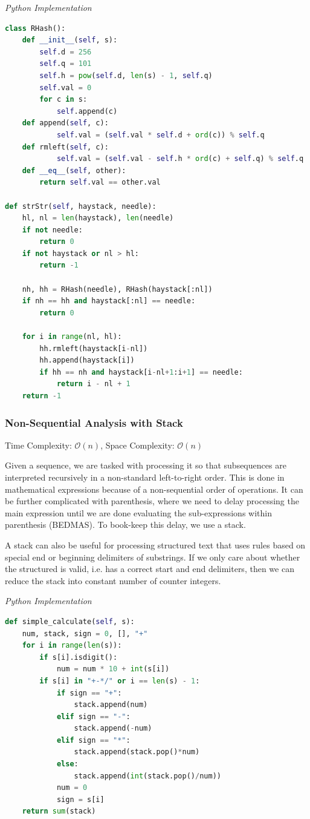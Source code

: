 \documentclass{article}
\newcommand{\bigO}{\mathcal{O}}
\begin{document}
\vspace{8pt} \emph{Python Implementation}
\begin{lstlisting}[language=Python]    
class RHash():
    def __init__(self, s):
        self.d = 256
        self.q = 101
        self.h = pow(self.d, len(s) - 1, self.q)
        self.val = 0
        for c in s:
            self.append(c)
    def append(self, c):
            self.val = (self.val * self.d + ord(c)) % self.q
    def rmleft(self, c):
            self.val = (self.val - self.h * ord(c) + self.q) % self.q 
    def __eq__(self, other):            
        return self.val == other.val
        
def strStr(self, haystack, needle):
    hl, nl = len(haystack), len(needle)
    if not needle:
        return 0
    if not haystack or nl > hl:
        return -1
  
    nh, hh = RHash(needle), RHash(haystack[:nl])
    if nh == hh and haystack[:nl] == needle:
        return 0
    
    for i in range(nl, hl):
        hh.rmleft(haystack[i-nl])
        hh.append(haystack[i])
        if hh == nh and haystack[i-nl+1:i+1] == needle:
            return i - nl + 1
    return -1
\end{lstlisting}

\subsubsection{Non-Sequential Analysis with Stack}
Time Complexity: $\bigO(n)$, Space Complexity: $\bigO(n)$

Given a sequence, we are tasked with processing it so that subsequences are interpreted recursively in a non-standard left-to-right order. This is done in mathematical expressions because of a non-sequential order of operations. It can be further complicated with parenthesis, where we need to delay processing the main expression until we are done evaluating the sub-expressions within parenthesis (BEDMAS). To book-keep this delay, we use a stack.

A stack can also be useful for processing structured text that uses rules based on special end or beginning delimiters of substrings. If we only care about whether the structured is valid, i.e. has a correct start and end delimiters, then we can reduce the stack into constant number of counter integers.

\vspace{8pt} \emph{Python Implementation}
\begin{lstlisting}[language=Python]
def simple_calculate(self, s):
    num, stack, sign = 0, [], "+"
    for i in range(len(s)):
        if s[i].isdigit():
            num = num * 10 + int(s[i])
        if s[i] in "+-*/" or i == len(s) - 1:
            if sign == "+":
                stack.append(num)
            elif sign == "-":
                stack.append(-num)
            elif sign == "*":
                stack.append(stack.pop()*num)
            else:
                stack.append(int(stack.pop()/num))
            num = 0
            sign = s[i]
    return sum(stack)
\end{lstlisting}
\end{document}
